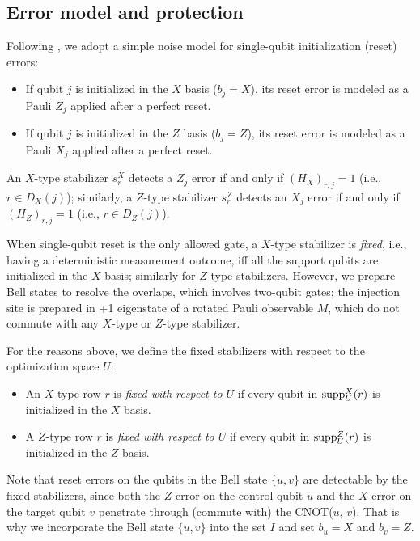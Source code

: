 \subsection{Error model and protection}

Following \cite{li_magic_2015,lao_magic_2022}, we adopt a simple noise model for single-qubit initialization (reset) errors:
\begin{itemize}
  \item If qubit $j$ is initialized in the $X$ basis ($b_j = X$), its reset error is modeled as a Pauli $Z_j$ applied after a perfect reset.
  \item If qubit $j$ is initialized in the $Z$ basis ($b_j = Z$), its reset error is modeled as a Pauli $X_j$ applied after a perfect reset.
\end{itemize}
An $X$-type stabilizer $s^X_r$ detects a $Z_j$ error if and only if $(H_X)_{r,j} = 1$ (i.e., $r \in D_X(j)$); similarly, a $Z$-type stabilizer $s^Z_r$ detects an $X_j$ error if and only if $(H_Z)_{r,j} = 1$ (i.e., $r \in D_Z(j)$). 

When single-qubit reset is the only allowed gate,
a $ X $-type stabilizer is \emph{fixed}, i.e., having a deterministic measurement outcome, iff
all the support qubits are initialized in the $ X $ basis;
similarly for $ Z $-type stabilizers.
However, we prepare Bell states to resolve the overlaps,
which involves two-qubit gates;
the injection site is prepared in +1 eigenstate of a rotated Pauli observable $ M $, which do not commute with any $X$-type  or $ Z $-type stabilizer.

For the reasons above, we define the fixed stabilizers with respect to the optimization space $ U $:
\begin{itemize}
  \item An $X$-type row $r$ is \emph{fixed with respect to $U$} if every qubit in $\mathrm{supp}^X_U(r)$ is initialized in the $X$ basis.
  \item A $Z$-type row $r$ is \emph{fixed with respect to $U$} if every qubit in $\mathrm{supp}^Z_U(r)$ is initialized in the $Z$ basis.
\end{itemize}

Note that reset errors on the qubits in the Bell state $ \{u,v\} $ are detectable by the fixed stabilizers,
since both the $ Z $ error on the control qubit $ u $
and the $ X $ error on the target qubit $ v $ penetrate through (commute with) the CNOT($ u $, $ v $). That is why we incorporate the Bell state $ \{u,v\} $ into the set $ I $ and set $ b_u = X $ and $ b_v = Z $.

